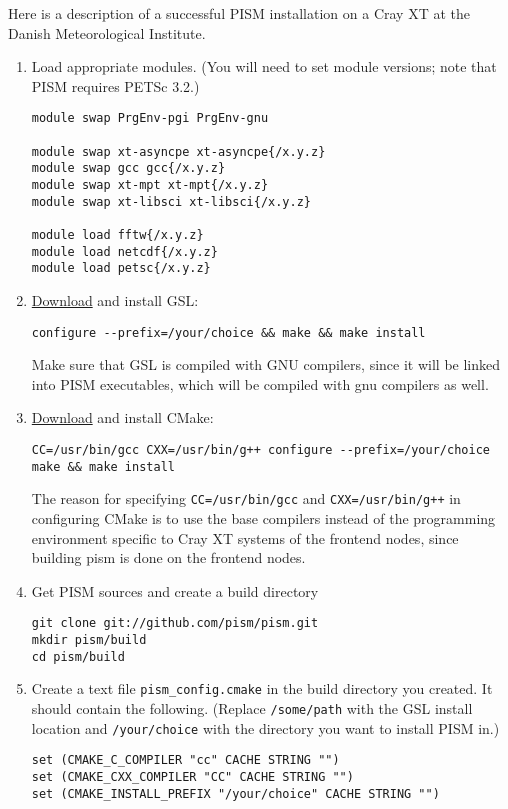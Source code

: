 \documentclass[titlepage,letterpaper,final]{scrartcl}
\begin{document}
Here is a description of a successful PISM installation on a Cray XT at the
Danish Meteorological Institute.

\begin{enumerate}
\item Load appropriate modules. (You will need to set module versions; note
  that PISM requires PETSc 3.2.)
\begin{verbatim}
module swap PrgEnv-pgi PrgEnv-gnu

module swap xt-asyncpe xt-asyncpe{/x.y.z}
module swap gcc gcc{/x.y.z}
module swap xt-mpt xt-mpt{/x.y.z}
module swap xt-libsci xt-libsci{/x.y.z}

module load fftw{/x.y.z}
module load netcdf{/x.y.z}
module load petsc{/x.y.z}
\end{verbatim}
\item \href{http://www.gnu.org/software/gsl}{Download} and install GSL:
\begin{verbatim}
configure --prefix=/your/choice && make && make install
\end{verbatim}
  Make sure that GSL is compiled with GNU compilers, since it will be linked
  into PISM executables, which will be compiled with gnu compilers as well.
\item \href{http://www.cmake.org}{Download} and install CMake:
\begin{verbatim}
CC=/usr/bin/gcc CXX=/usr/bin/g++ configure --prefix=/your/choice
make && make install
\end{verbatim}
  The reason for specifying \texttt{CC=/usr/bin/gcc} and \texttt{CXX=/usr/bin/g++} in
  configuring CMake is to use the base compilers instead of the programming
  environment specific to Cray XT systems of the frontend nodes, since building
  pism is done on the frontend nodes.
\item Get PISM sources and create a build directory
\begin{verbatim}
git clone git://github.com/pism/pism.git
mkdir pism/build
cd pism/build
\end{verbatim}
\item Create a text file \texttt{pism_config.cmake} in the build directory you
  created. It should contain the following.
  (Replace \texttt{/some/path} with the GSL install location and
  \texttt{/your/choice} with the directory you want to install PISM in.)
\begin{verbatim}
set (CMAKE_C_COMPILER "cc" CACHE STRING "") 
set (CMAKE_CXX_COMPILER "CC" CACHE STRING "")
set (CMAKE_INSTALL_PREFIX "/your/choice" CACHE STRING "")


\end{verbatim}
\end{enumerate}
\end{document}
